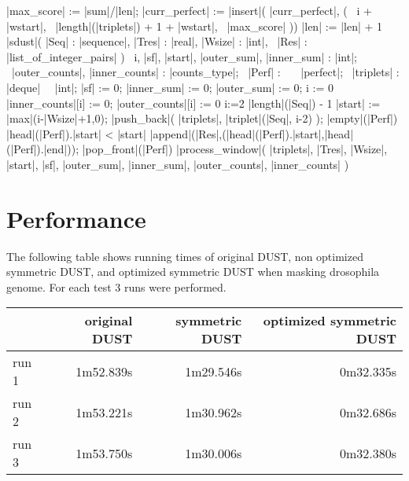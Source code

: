 \documentclass{article}
\newcommand{\OF}{\ \keyword{of}\ }
\newcommand{\VARP}{\keyword{var}\ }
\newcommand{\LIST}{\keyword{list}\ }
\begin{document}
\begin{program}
                \THEN |max_score| := |sum|/|len|;
                      |curr_perfect| := |insert|(
                          \qquad|curr_perfect|,
                          \qquad(
                          \qquad\ \quad i + |wstart|,
                          \qquad\ \quad|length|(|triplets|) + 1 + |wstart|,
                          \qquad\ \quad|max_score|
                          \qquad))
                \FI
            \FI
            |len| := |len| + 1
        \OD
    \FI
    \END
\ENDPROC
\PROC |sdust|(
    \tab |Seq|       : |sequence|,
         |Tres|      : |real|,
         |Wsize|     : |int|,
         \VARP |Res| : |list_of_integer_pairs| )\untab\BODY
    \BEGIN
    \VARP i, |sf|, |start|, |outer_sum|, |inner_sum| : |int|;
    \VARP |outer_counts|, |inner_counts|             : |counts_type|;
    \VARP |Perf|                                     : \LIST \OF |perfect|;
    \VARP |triplets|                                 : |deque| \OF |int|;
    |sf|        := 0;
    |inner_sum| := 0;
    |outer_sum| := 0;
    \FOR i := 0  \DO
        |inner_counts|[i] := 0;
        |outer_counts|[i] := 0
    \OD
    \FOR i:=2 \TO |length|(|Seq|) - 1 \DO
        |start|        := |max|(i-|Wsize|+1,0);
        |push_back|( |triplets|, |triplet|(|Seq|, i-2) );
        \WHILE \NOT |empty|(|Perf|) \AND |head|(|Perf|).|start| < |start| \DO
            |append|(|Res|,(|head|(|Perf|).|start|,|head|(|Perf|).|end|));
            |pop_front|(|Perf|)
        \OD
        |process_window|( |triplets|, |Tres|, |Wsize|, |start|, |sf|, 
        \qquad |outer_sum|, |inner_sum|, |outer_counts|, |inner_counts| )
    \OD
    \END
\ENDPROC
\END
\end{program}

\section{Performance}

The following table shows running times of original DUST, non optimized 
symmetric DUST, and optimized symmetric DUST when masking drosophila genome.
For each test 3 runs were performed.

\vskip 1cm
\begin{tabular}{|l|r|r|r|}
\hline
 & original DUST & symmetric DUST & optimized symmetric DUST \\
\hline
run 1 & 1m52.839s & 1m29.546s & 0m32.335s \\
run 2 & 1m53.221s & 1m30.962s & 0m32.686s \\
run 3 & 1m53.750s & 1m30.006s & 0m32.380s \\
\hline
\end{tabular}
\end{document}
